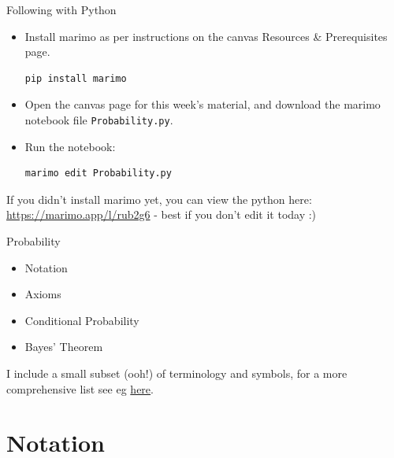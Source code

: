 \documentclass[10pt,sans,english,compress,xcolor=dvipsnames]{beamer}
\begin{document}
\begin{frame}[fragile]{Following with Python}

\begin{itemize}

\item[1] Install marimo as per instructions on the canvas Resources \& Prerequisites page.
\begin{verbatim}
pip install marimo
\end{verbatim}
\item[2] Open the canvas page for this week's material, and download the marimo notebook file \texttt{Probability.py}. 
\item[3] Run the notebook:
\begin{verbatim}
marimo edit Probability.py
\end{verbatim}
\end{itemize}

If you didn't install marimo yet, you can view the python here: \href{https://marimo.app/l/rub2g6}{https://marimo.app/l/rub2g6} - best if you don't edit it today :)\\[1ex]
\end{frame} 

 


\begin{frame}{Probability}
\large
\begin{itemize}
\item Notation\\[1ex]
\item Axioms\\[1ex]
\item Conditional Probability\\[1ex]
\item Bayes' Theorem\\[2ex]
\end{itemize}

I include a  small subset (ooh!) of terminology and symbols, for a more comprehensive list see eg \href{https://mathvault.ca/hub/higher-math/math-symbols/set-theory-symbols/}{here}.

\end{frame} 

\section*{Notation }
\end{document}
